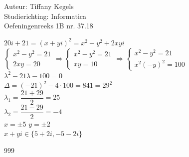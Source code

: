 \documentclass[a4paper]{article}
\begin{document}
  
\noindent \large Auteur: Tiffany Kegels \\
\noindent \large Studierichting: Informatica\\
\noindent \large Oefeningenreeks 1B nr. 37.18\\

\medskip

\normalsize

$20i+21 = (x+yi)^2 = x^2 - y^2 + 2xyi$\\

$\left\{
	\begin{array}{l} 
		x^2 - y^2 = 21\\
		2xy = 20
	\end{array}
\right .
\Rightarrow 
\left\{
	\begin{array}{l} 
		x^2 - y^2 = 21\\
		xy = 10
	\end{array}
\right .
\Rightarrow 
\left\{
	\begin{array}{l} 
		x^2 - y^2 = 21\\
		x^2(-y)^2 = 100
	\end{array}
\right .$\\

$\lambda^2 -21\lambda - 100 = 0$\\

$\Delta = (-21)^2 -4\cdot100 = 841 = 29^2$\\

$\lambda_1 = \dfrac{21 + 29}{2} = 25$\\

$\lambda_2 = \dfrac{21-29}{2} = -4$\\

$x = \pm5$
$y = \pm2$\\

$x+yi \in \{5+2i,-5-2i\}$\\

\begin{thebibliography}{999}

\end{thebibliography}
\end{document}
